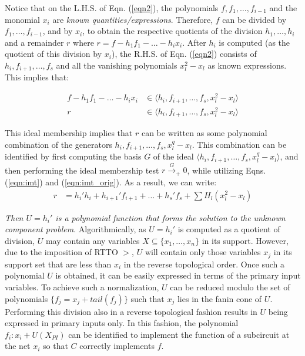 Notice that on the L.H.S. of Eqn. (\ref{eqn2}), the polynomials $f,
f_1,\dots,f_{i-1}$ and the monomial $x_i$ are {\it known
quantities/expressions}. Therefore, $f$ can be divided by
$f_1,\dots,f_{i-1}$, and by $x_i$, to obtain the respective quotients
of the division $h_1,\dots,h_i$ and a remainder $r$ where $r = f -
h_1f_1 - \dots-h_ix_i$. After $h_i$ is computed (as the quotient of
this division by $x_i$), the R.H.S. of Eqn. (\ref{eqn2}) consists of
$h_i, f_{i+1}, \dots, f_s$ and all the vanishing polynomials
$x_l^2-x_l$ as known expressions. This implies that: 

\vspace{-0.13in}
\begin{eqnarray}
f - h_1f_1 - \dots-h_ix_i & \in \langle h_i,f_{i+1},\dots,f_s,  x_l^2-x_l\rangle\\
r & \in \langle h_i,f_{i+1},\dots,f_s, x_l^2-x_l\rangle\label{eqn3}
\end{eqnarray}
\vspace{-0.1in}

This ideal membership implies that $r$ can be written as some
polynomial combination of the generators $h_i,f_{i+1},\dots,f_s,
x_l^q-x_l$. This combination can be identified by first computing the
\Grobner basis $G$ of the ideal $\langle
h_i,f_{i+1},\dots,f_s,x_l^q-x_l\rangle$, and then performing the ideal
membership test $r\xrightarrow{G}_+0$, while utilizing
Eqns. (\ref{eqn:imt}) and (\ref{eqn:imt_orig}). As a result, we can
write:
\vspace{-0.1in}
\begin{align}
r & = h_i'h_i+h_{i+1}'f_{i+1}+\dots+h_s'f_s+ \sum H_l (x_l^2-x_l)
\end{align}

{\it Then $U = h_i'$ is a polynomial function that forms the solution
  to the unknown component problem}. Algorithmically, as $U = h_i'$ is
computed as a quotient of division, $U$ may contain any variables
$X \subseteq \{x_1,\dots,x_n\}$ in its support. However, due to the
imposition of RTTO $>$, $U$ will contain only those variables $x_j$
in its support set that are less than $x_i$ in the reverse topological
order. Once such a polynomial $U$ is obtained, it can be easily
expressed in terms of the primary input variables. To achieve such a
normalization, $U$ can be reduced modulo the set of polynomials
$\{f_j=x_j + tail(f_j)\}$ such that $x_j$ lies in the fanin cone of
$U$. Performing this division also in a reverse topological fashion
results in $U$ being expressed in primary inputs only. In this
fashion, the polynomial $f_i: x_i + U(X_{PI})$ can be identified to
implement the function of a subcircuit at the net $x_i$ so that $C$
correctly implements $f$.   

